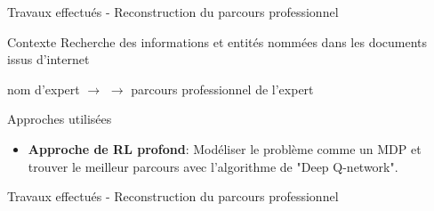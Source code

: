 \documentclass{beamer}
\begin{document}
{{%
%
%
%
%



\begin{frame}{Travaux effectués - Reconstruction du parcours professionnel}
\begin{block}{Contexte}
Recherche des informations et entités nommées dans les documents issus d'internet 
\begin{center}
 nom d'expert $\longrightarrow$  $\longrightarrow$ parcours professionnel de l'expert  
\end{center}
\end{block}

\begin{block}{Approches utilisées}
\begin{itemize}
\item \textbf{Approche de RL profond}: Modéliser le problème comme un MDP et trouver le meilleur parcours avec  l'algorithme de "Deep Q-network".  
\end{itemize}
\end{block}
\end{frame}


\begin{frame}{Travaux effectués - Reconstruction du parcours professionnel}


\end{frame}}}
\end{document}
